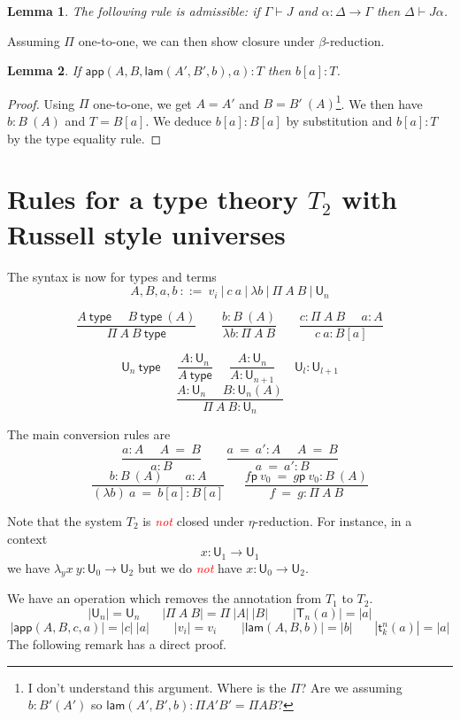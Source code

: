 \documentclass[11pt,a4paper]{article}
\newtheorem{lemma}{Lemma}[theorem]
\theoremstyle{definition}
\newcommand{\conv}{=}
\def\UU{\mathsf{U}}
\newcommand{\type}{\mathsf{type}}
\newcommand{\LAM}{\mathsf{lam}}
\newcommand{\APP}{\mathsf{app}}
\newcommand{\T}{\mathsf{T}}
\newcommand{\sT}{\mathsf{t}}
\newcommand{\pp}{\mathsf{p}}
\newcommand{\EMP}[1]{\emph{\textcolor{red}{#1}}}
\begin{document}
\begin{lemma}
  The following rule is admissible: if $\Gamma\vdash J$ and $\alpha:\Delta\rightarrow\Gamma$
  then $\Delta\vdash J\alpha$.
\end{lemma}

Assuming $\Pi$ one-to-one, we can then show closure under $\beta$-reduction.

\begin{lemma}
  If $\APP(A,B,\LAM(A',B',b),a):T$ then $b[a]:T$.
\end{lemma}

\begin{proof}
  Using $\Pi$ one-to-one, we get $A=A'$ and $B=B'~(A)$\footnote{I don't understand this argument. Where is the $\Pi$? Are we assuming $b : B' (A')$ so $\LAM(A',B',b) : \Pi A' B' = \Pi A B$?}. We then have $b:B~(A)$ and $T = B[a]$.
  We deduce $b[a]:B[a]$ by substitution and $b[a]:T$ by the type equality rule.
\end{proof}

\section{Rules for a type theory $T_2$ with Russell style universes}

The syntax is now for types and terms
$$
A,B,a,b~::=~v_i~|~c~a~|~\lambda b~|~\Pi~{A}~B~|~\UU_n
$$

$$
\frac{A~\type~~~~~~B~\type~(A)}{\Pi~A~B~\type}~~~~~~~~~
\frac{b:B~(A)}{\lambda b:\Pi~A~B}~~~~~~~~
\frac{c:\Pi~A~B~~~~~~a:A}
     {c~a:B[a]}
$$

$$
\UU_n~\type~~~~~~
\frac{A:\UU_{n}}{A~\type}
~~~~~~\frac{A:\UU_{n}}{A:\UU_{n+1}}
~~~~~~~
{\UU_l}:\UU_{l+1}
$$
$$
\frac{A:\UU_{n}~~~~~~B:\UU_n(A)}
     {\Pi~A~B:\UU_{n}}$$

The main conversion rules are
$$
\frac{ a:A~~~~~~ A~ \conv~ B}{ a:B}~~~~~~~~~
\frac{ a ~\conv~a':A~~~~~~ A  ~\conv~ B}{ a ~\conv~a':B}
$$
$$
\frac{b:B~(A)~~~~~~~~ a:A}{ (\lambda b)~a  ~\conv~ b[a]:B[a]}
~~~~~~~
\frac{f\pp~v_0 ~\conv~ g\pp~v_0:B~(A)}{ f ~\conv~ g : \Pi~A~B}
$$



\medskip

     Note that the system $T_2$ is \EMP{not} closed under $\eta$-reduction. For instance, in a context
     $$x:\UU_1\rightarrow\UU_1$$
     we have $\lambda_yx~y:\UU_0\rightarrow\UU_2$ but we do \EMP{not} have
     $x:\UU_0\rightarrow\UU_2$.


\medskip

We have an operation which removes the annotation from $T_1$ to $T_2$.
$$
|\UU_n| = \UU_n~~~~~~~~|\Pi~A~B| = \Pi~|A|~|B|~~~~~~~~~|\T_n(a)| = |a|
$$
$$
|\APP(A,B,c,a)| = |c|~|a|~~~~~~~~~|v_i| = v_i~~~~~~~~~|\LAM(A,B,b)| = |b|~~~~~~~~|\sT_k^n(a)| = |a|
$$
The following remark has a direct proof.
\end{document}
